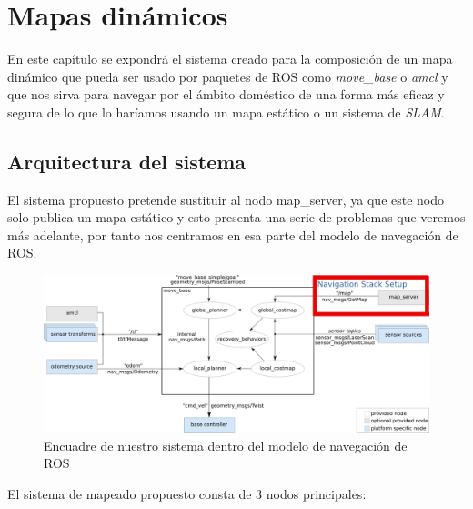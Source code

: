 \chapter{Mapas dinámicos}
\label{cap:mapasdinamicos}
En este capítulo se expondrá el sistema creado para la composición de un mapa dinámico que pueda ser usado por paquetes de ROS como \textit{move\_base} o \textit{amcl} y que nos sirva para navegar por el ámbito doméstico de una forma más eficaz y segura de lo que lo haríamos usando un mapa estático o un sistema de \textit{SLAM}.

\section{Arquitectura del sistema}
\label{cap:arquitecturadelsistema}
El sistema propuesto pretende sustituir al nodo map\_server, ya que este nodo solo publica un mapa estático y esto presenta una serie de problemas que veremos más adelante, por tanto nos centramos en esa parte del modelo de navegación de ROS.
\begin{figure} [H]
  \begin{center}
    \includegraphics[width=16cm]{img/cap5/navigationstackzoom}
  \end{center}
  \caption{Encuadre de nuestro sistema dentro del modelo de navegación de ROS}
  \label{fig:navigationstackzoom}
\end{figure}

El sistema de mapeado propuesto consta de 3 nodos principales:

